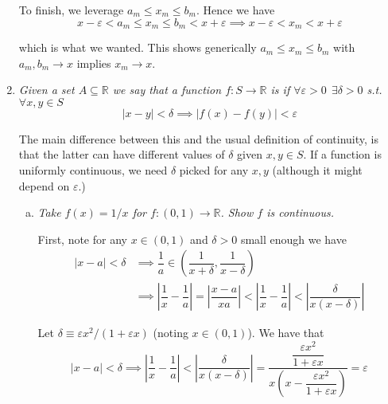 \documentclass{article}
\begin{document}
\begin{enumerate}[1.]
    To finish, we leverage $a_m \le x_m \le b_m$. Hence we have
    \[
      x - \varepsilon < a_m \le x_m \le b_m < x + \varepsilon
      \implies
      x - \varepsilon < x_m < x + \varepsilon
    \]

    which is what we wanted. This shows generically $a_m \le x_m \le b_m$ with $a_m, b_m \to x$ implies $x_m \to x$.

  \item {\itshape
    Given a set $A \subseteq \mathbb{R}$ we say that a function $f: S \to \mathbb{R}$ is  if $\forall \varepsilon > 0 ~~ \exists \delta > 0$ s.t. $\forall x, y \in S$
    \[
      |x - y| < \delta \implies |f(x) - f(y)| < \varepsilon
    \]

    The main difference between this and the usual definition of continuity, is that the latter can have different values of $\delta$ given $x, y \in S$. If a function is uniformly continuous, we need $\delta$ picked for any $x, y$ (although it might depend on $\varepsilon$.)}
    \begin{enumerate}[a)]
      \item \textit{Take $f(x) = 1 / x$ for $f: (0, 1) \to \mathbb{R}$. Show $f$ is continuous.}

        \solution First, note for any $x \in (0, 1)$ and $\delta > 0$ small enough we have
        \begin{align*}
            |x - a| < \delta
            &
            \implies
            \dfrac{1}{a}
            \in
            \left(
              \dfrac{1}{x + \delta},
              \dfrac{1}{x - \delta}
            \right)
            \\
            &
            \implies
            \left|\dfrac{1}{x} - \dfrac{1}{a}\right|
            =
            \left|\dfrac{x - a}{xa}\right|
            <
            \left|\dfrac{1}{x} - \dfrac{1}{a}\right|
            <
            \left|\dfrac{\delta}{x (x - \delta)}\right|
        \end{align*}

        Let $\delta \equiv \varepsilon x^2 / (1 + \varepsilon x)$ (noting $x \in (0, 1)$). We have that
        \[
            |x - a| < \delta
            \implies
            \left|\dfrac{1}{x} - \dfrac{1}{a}\right|
            <
            \left|\dfrac{\delta}{x (x - \delta)}\right|
            =
            \dfrac{\dfrac{\varepsilon x^2}{1 + \varepsilon x}}{x \left(x - \dfrac{\varepsilon x^2}{1 + \varepsilon x}\right)}
            =
            \varepsilon
        \]


\end{enumerate}
\end{enumerate}
\end{document}
